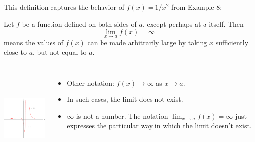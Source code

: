 \begin{frame}
This definition captures the behavior of $f(x) = 1/x^2$ from Example 8:
\begin{definition}
Let $f$ be a function defined on both sides of $a$, except perhaps at $a$ itself.  Then
\[
\lim_{x\rightarrow a}f(x) = \infty 
\]
means the values of $f(x)$ can be made arbitrarily large by taking $x$ sufficiently close to $a$, but not equal to $a$.
\end{definition}
\begin{columns}[c]
\ \includegraphics[height=4cm]{limits/pictures/02-02-posinf.pdf}%
\begin{itemize}
\item<2->  Other notation: $f(x) \rightarrow \infty $ as $x\rightarrow a$.
\item<3->  In such cases, the limit does not exist.
\item<4->  $\infty$ is not a number.  The notation $\lim_{x\rightarrow a}f(x) = \infty$ just expresses the particular way in which the limit doesn't exist.
\end{itemize}
\end{columns}
\end{frame}




